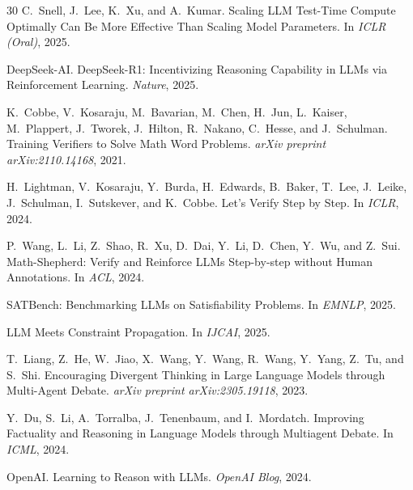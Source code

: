 \documentclass[11pt,a4paper]{article}
\begin{document}
\begin{thebibliography}{30}
C.~Snell, J.~Lee, K.~Xu, and A.~Kumar.
\newblock Scaling LLM Test-Time Compute Optimally Can Be More Effective Than Scaling Model Parameters.
\newblock In \emph{ICLR (Oral)}, 2025.

DeepSeek-AI.
\newblock DeepSeek-R1: Incentivizing Reasoning Capability in LLMs via Reinforcement Learning.
\newblock \emph{Nature}, 2025.

K.~Cobbe, V.~Kosaraju, M.~Bavarian, M.~Chen, H.~Jun, L.~Kaiser, M.~Plappert, J.~Tworek, J.~Hilton, R.~Nakano, C.~Hesse, and J.~Schulman.
\newblock Training Verifiers to Solve Math Word Problems.
\newblock \emph{arXiv preprint arXiv:2110.14168}, 2021.

H.~Lightman, V.~Kosaraju, Y.~Burda, H.~Edwards, B.~Baker, T.~Lee, J.~Leike, J.~Schulman, I.~Sutskever, and K.~Cobbe.
\newblock Let's Verify Step by Step.
\newblock In \emph{ICLR}, 2024.

P.~Wang, L.~Li, Z.~Shao, R.~Xu, D.~Dai, Y.~Li, D.~Chen, Y.~Wu, and Z.~Sui.
\newblock Math-Shepherd: Verify and Reinforce LLMs Step-by-step without Human Annotations.
\newblock In \emph{ACL}, 2024.

SATBench: Benchmarking LLMs on Satisfiability Problems.
\newblock In \emph{EMNLP}, 2025.

LLM Meets Constraint Propagation.
\newblock In \emph{IJCAI}, 2025.

T.~Liang, Z.~He, W.~Jiao, X.~Wang, Y.~Wang, R.~Wang, Y.~Yang, Z.~Tu, and S.~Shi.
\newblock Encouraging Divergent Thinking in Large Language Models through Multi-Agent Debate.
\newblock \emph{arXiv preprint arXiv:2305.19118}, 2023.

Y.~Du, S.~Li, A.~Torralba, J.~Tenenbaum, and I.~Mordatch.
\newblock Improving Factuality and Reasoning in Language Models through Multiagent Debate.
\newblock In \emph{ICML}, 2024.

OpenAI.
\newblock Learning to Reason with LLMs.
\newblock \emph{OpenAI Blog}, 2024.

\end{thebibliography}

\appendix
\end{document}
